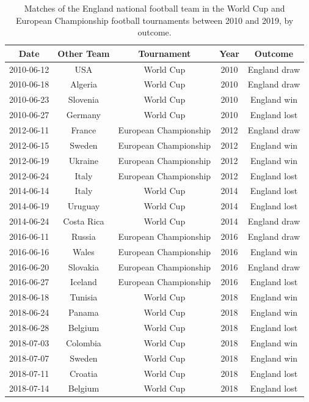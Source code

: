 \documentclass[12pt, a4paper]{article}
\begin{document}
\begin{table}
\centering
    \caption{Matches of the England national football team in the World Cup and European Championship football tournaments between 2010 and 2019, by outcome.}
\begin{tabular}{ccccc}
  \hline
\textbf{Date} & \textbf{Other Team} & \textbf{Tournament} & \textbf{Year} & \textbf{Outcome} \\ 
  \hline
2010-06-12 & USA & World Cup & 2010 & England draw \\ 
  2010-06-18 & Algeria & World Cup & 2010 & England draw \\ 
  2010-06-23 & Slovenia & World Cup & 2010 & England win \\ 
  2010-06-27 & Germany & World Cup & 2010 & England lost \\ 
  2012-06-11 & France & European Championship & 2012 & England draw \\ 
  2012-06-15 & Sweden & European Championship & 2012 & England win \\ 
  2012-06-19 & Ukraine & European Championship & 2012 & England win \\ 
  2012-06-24 & Italy & European Championship & 2012 & England lost \\ 
  2014-06-14 & Italy & World Cup & 2014 & England lost \\ 
  2014-06-19 & Uruguay & World Cup & 2014 & England lost \\ 
  2014-06-24 & Costa Rica & World Cup & 2014 & England draw \\ 
  2016-06-11 & Russia & European Championship & 2016 & England draw \\ 
  2016-06-16 & Wales & European Championship & 2016 & England win \\ 
  2016-06-20 & Slovakia & European Championship & 2016 & England draw \\ 
  2016-06-27 & Iceland & European Championship & 2016 & England lost \\ 
  2018-06-18 & Tunisia & World Cup & 2018 & England win \\ 
  2018-06-24 & Panama & World Cup & 2018 & England win \\ 
  2018-06-28 & Belgium & World Cup & 2018 & England lost \\ 
  2018-07-03 & Colombia & World Cup & 2018 & England win \\ 
  2018-07-07 & Sweden & World Cup & 2018 & England win \\ 
  2018-07-11 & Croatia & World Cup & 2018 & England lost \\ 
  2018-07-14 & Belgium & World Cup & 2018 & England lost \\ 
   \hline
\end{tabular}
  \label{Tab:matches}
\end{table}
\end{document}

